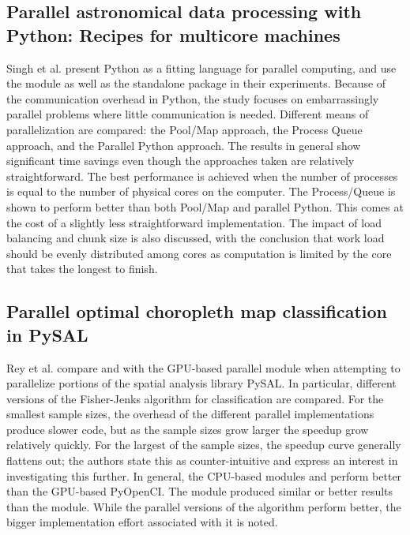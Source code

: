 \subsection{Parallel astronomical data processing with Python: Recipes for multicore machines}
Singh et al. \cite{singh_2013_parallel_padpwprfmm} present Python as a fitting language for parallel computing, and use the
 module as well as the standalone  package in their experiments. Because of the
communication overhead in Python, the study focuses on embarrassingly parallel problems where little communication is needed.
Different means of parallelization are
compared: the Pool/Map approach, the Process Queue approach, and the Parallel Python approach. %
The results in general show significant time savings even though the approaches taken are relatively straightforward.
The best performance is achieved when the number of processes is equal to the number of physical cores on the computer.
The Process/Queue is shown to perform better than both Pool/Map and parallel Python. This comes at the cost of a slightly less
straightforward implementation. The impact of load balancing and chunk size is also discussed, with the conclusion that work load
should be evenly distributed among cores as computation is limited by the core that takes the longest to finish.

\subsection{Parallel optimal choropleth map classification in PySAL}
Rey et al. \cite{rey_2013_parallel_pocmcip} compare  and  with the GPU-based parallel
module  when attempting to parallelize portions of the spatial analysis library PySAL. In particular, different
versions of the Fisher-Jenks algorithm for classification are compared. For the smallest sample sizes, the overhead of the
different parallel implementations produce slower code, but as the sample sizes grow larger the speedup grow relatively quickly.
For the largest of the sample sizes, the speedup curve generally flattens out; the authors state this as counter-intuitive and
express an interest in investigating this further. In general, the CPU-based modules  and 
perform better than the GPU-based PyOpenCI. The  module produced similar or better results than the
 module.
While the parallel versions of the algorithm perform better, the bigger implementation effort associated with it is noted.

